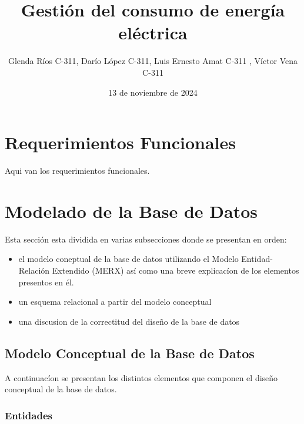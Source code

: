 \documentclass{article}
\title{Gestión del consumo de energía eléctrica}
\author{Glenda Ríos C-311, Darío López C-311, Luis Ernesto Amat C-311 , Víctor Vena C-311}
\date{13 de noviembre de 2024}
\begin{document}
\maketitle

\section{Requerimientos Funcionales}
Aqui van los requerimientos funcionales.

\section{Modelado de la Base de Datos}
Esta sección esta dividida en varias subsecciones donde se presentan en orden:
\begin{itemize}
\item el modelo coneptual de la base de datos utilizando el Modelo Entidad-Relación Extendido (MERX) así como una breve explicacíon de los elementos presentos en él.
\item un esquema relacional a partir del modelo conceptual
\item una discusion de la correctitud del diseño de la base de datos
\end{itemize}
\subsection{Modelo Conceptual de la Base de Datos}
A continuacíon se presentan los distintos elementos que componen el diseño conceptual de la base de datos.

\subsubsection{Entidades}
\end{document}
